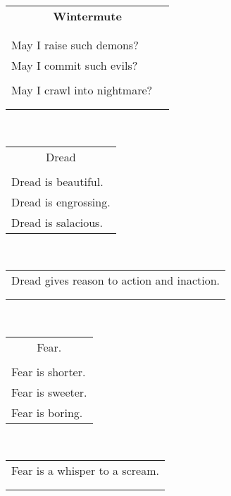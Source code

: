\documentclass{article}
\begin{document}
\newcommand{\h}{\hspace*{2ex}}
\newcommand{\HHHH}{\hspace*{32ex}}

\begin{center}
\begin{tabular}{ll}
\multicolumn{2}{c}{\large\textbf{Wintermute}} \\
&\\\hline
&\\
May I raise such demons? &\\
May I commit such evils? &\\
&\\
May I crawl into nightmare? &\\
&\\
&\\
\end{tabular} \\
\begin{tabular}{l}
\multicolumn{1}{c}{Dread} \\
\\
Dread is beautiful.\\
Dread is engrossing.\\
Dread is salacious.\\
\end{tabular} \\
\begin{tabular}{l}
\\
Dread gives reason to action and inaction. \\
\\
\\
\end{tabular} \\
\begin{tabular}{l}
\multicolumn{1}{c}{Fear.} \\
\\
Fear is shorter. \\
Fear is sweeter. \\
Fear is boring. \\
\end{tabular}\\
\begin{tabular}{c}
\\
Fear is a whisper to a scream. \\
\\
\\
\end{tabular}\\
\begin{tabular}{l}

\end{tabular}
\end{center}
\end{document}
